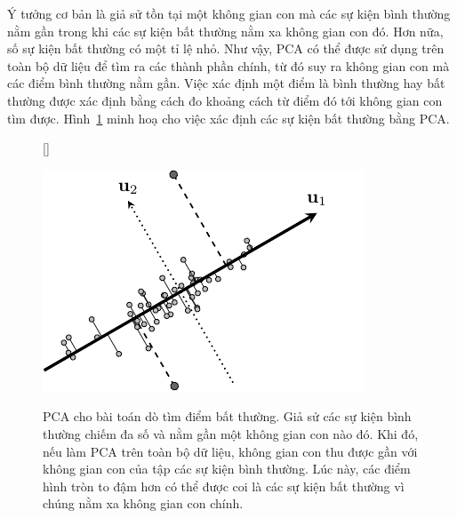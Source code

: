 Ý tưởng cơ bản là giả sử tồn tại một không gian con mà các sự kiện bình thường
nằm gần trong khi các sự kiện bất thường nằm xa không gian con đó. Hơn nữa, số
sự kiện bất thường có một tỉ lệ nhỏ. Như vậy, PCA có thể được sử dụng trên toàn
bộ dữ liệu để tìm ra các thành phần chính, từ đó suy ra không gian con mà các điểm bình thường nằm gần.
Việc xác định một điểm là bình thường hay bất thường được xác định bằng cách đo
khoảng cách từ điểm đó tới không gian con tìm được. Hình~\ref{fig:28_4} minh hoạ
cho việc xác định các sự kiện bất thường bằng PCA. 
 
\begin{figure}[t]
   
    [\FBwidth]
    {\caption{ PCA cho bài toán dò tìm điểm bất thường. Giả sử
    các sự kiện {bình thường} chiếm đa số và nằm gần  một không
    gian con nào đó. Khi đó, nếu làm PCA trên toàn bộ dữ liệu, không gian con
    thu được gần với không gian con của tập các sự kiện {bình thường}.
    Lúc này, các
    điểm hình tròn to đậm hơn có thể được coi là các sự kiện {bất thường} vì chúng nằm xa không gian con chính.} 
    \label{fig:28_4}}
    { %
    \includegraphics[width=.45\textwidth]{Chapters/07_DimemsionalityReduction/28_pca2/latex/abnormal.pdf}
    }
\end{figure}

 
